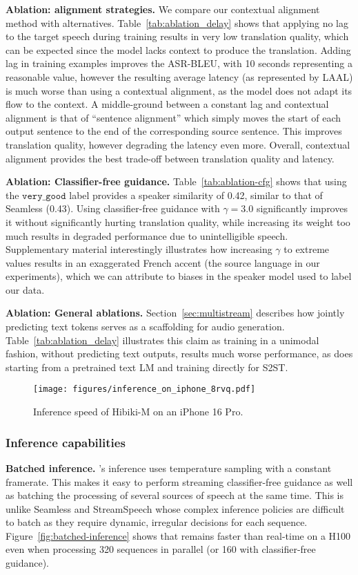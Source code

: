 \textbf{Ablation: alignment strategies.} We compare our contextual alignment method with alternatives. Table~\ref{tab:ablation_delay} shows that applying no lag to the target speech during training results in very low translation quality, which can be expected since the model lacks context to produce the translation. Adding lag in training examples improves the ASR-BLEU, with 10 seconds representing a reasonable value, however the resulting average latency (as represented by LAAL) is much worse than using a contextual alignment, as the model does not adapt its flow to the context. A middle-ground between a constant lag and contextual alignment is that of ``sentence alignment'' which simply moves the start of each output sentence to the end of the corresponding source sentence. This improves translation quality, however degrading the latency even more. Overall, contextual alignment provides the best trade-off between translation quality and latency.

\textbf{Ablation: Classifier-free guidance.} Table~\ref{tab:ablation-cfg} shows that using the $\texttt{very\_good}$ label provides a speaker similarity of 0.42, similar to that of Seamless (0.43). Using classifier-free guidance with $\gamma = 3.0$ significantly improves it without significantly hurting translation quality, while increasing its weight too much results in degraded performance due to unintelligible speech. Supplementary material interestingly illustrates how increasing $\gamma$ to extreme values results in an exaggerated French accent (the source language in our experiments), which we can attribute to biases in the speaker model used to label our data.

\textbf{Ablation: General ablations.} Section~\ref{sec:multistream} describes how jointly predicting text tokens serves as a scaffolding for audio generation. Table~\ref{tab:ablation_delay} illustrates this claim as training \ours in a unimodal fashion, without predicting text outputs, results much worse performance, as does starting from a pretrained text LM and training directly for S2ST.

\begin{figure}[t]
    \centering
    \texttt{[image: figures/inference\_on\_iphone\_8rvq.pdf]}
    \caption{Inference speed of Hibiki-M on an iPhone 16 Pro.}
    \label{fig:iphone-inference}
\end{figure}

\subsubsection{Inference capabilities}
\label{sec:inference_capabilities}
\textbf{Batched inference.} \ours's inference uses temperature sampling with a constant framerate. This makes it easy to perform streaming classifier-free guidance as well as batching the processing of several sources of speech at the same time. This is unlike Seamless and StreamSpeech whose complex inference policies are difficult to batch as they require dynamic, irregular decisions for each sequence. Figure~\ref{fig:batched-inference} shows that \ours remains faster than real-time on a H100 even when processing 320 sequences in parallel (or 160 with classifier-free guidance).

